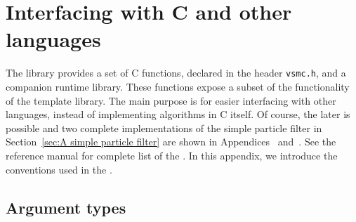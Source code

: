 \chapter{Interfacing with C and other languages}
\label{chap:Interfacing with C and other languages}

The library provides a set of C functions, declared in the header
\verb|vsmc.h|, and a companion runtime library. These functions expose a subset
of the functionality of the \cpp template library. The main purpose is for
easier interfacing with other languages, instead of implementing algorithms in
C itself. Of course, the later is possible and two complete \cnn
implementations of the simple particle filter in Section~\ref{sec:A simple
  particle filter} are shown in Appendices~ and~. See the reference manual for complete list of the \api. In this appendix,
we introduce the conventions used in the \api.

\section{Argument types}
\label{sec:Argument types}

